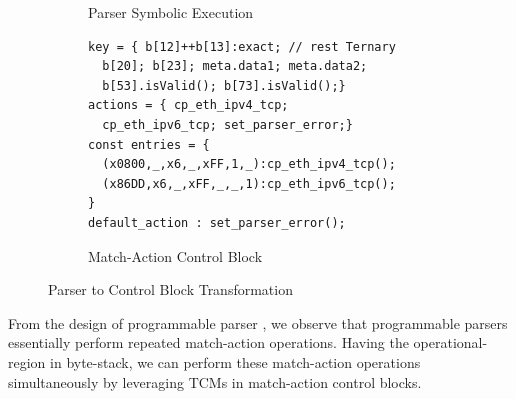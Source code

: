 \documentclass[letterpaper,twocolumn,10pt]{article}
\begin{document}
\begin{figure}[!ht]
\begin{subfigure}[b]{0.26\linewidth}
        \caption{Parser Symbolic Execution}
        \label{subfig:parser-symbolic-execution}
    \end{subfigure}
    \begin{subfigure}[b]{.47\linewidth}
    \centering
    \begin{lstlisting}[frame=none]
key = { b[12]++b[13]:exact; // rest Ternary
  b[20]; b[23]; meta.data1; meta.data2;
  b[53].isValid(); b[73].isValid();}
actions = { cp_eth_ipv4_tcp;
  cp_eth_ipv6_tcp; set_parser_error;}
const entries = {
  (x0800,_,x6,_,xFF,1,_):cp_eth_ipv4_tcp();
  (x86DD,x6,_,xFF,_,_,1):cp_eth_ipv6_tcp();
}
default_action : set_parser_error();
\end{lstlisting}
\vspace*{-10pt}
\caption{Match-Action Control Block}
\label{subfig:parser-mat}
\end{subfigure}
\caption{Parser to Control Block Transformation}
\label{fig:parser-to-control-block-transformation}
\end{figure}

 From the design of programmable parser 
\cite{6665172}, we 
observe that programmable parsers essentially perform repeated 
match-action operations.
Having the operational-region in byte-stack, we can perform these 
match-action operations simultaneously by leveraging  TCMs in 
match-action control blocks.
\end{document}
